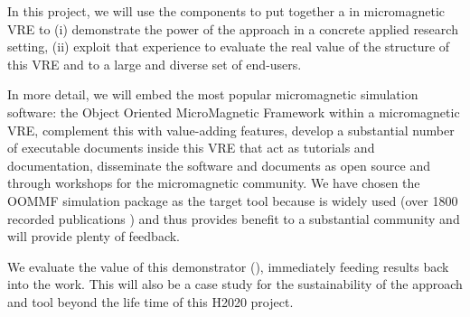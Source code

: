In this project, we will use the \TheProject components to put
together a in micromagnetic VRE to (i) demonstrate the power of the
approach in a concrete applied research setting, (ii) exploit that
experience to evaluate the real value of the structure of this VRE and
\TheProject to a large and diverse set of end-users.

In more detail, we will embed the most popular micromagnetic
simulation software: the Object Oriented MicroMagnetic Framework
\cite{OOMMF-url} within a micromagnetic VRE, complement this with
value-adding features, develop a substantial number of executable
documents inside this VRE that act as tutorials and documentation,
disseminate the software and documents as open source and through
workshops for the micromagnetic community.  We have chosen the OOMMF
simulation package as the target tool because is widely used (over
1800 recorded publications \cite{OOMMF-citations-url}) and thus
provides benefit to a substantial community and will provide plenty of
feedback.

We evaluate the value of this demonstrator
(), immediately feeding
results back into the \TheProject work. This will also
be a case study for the sustainability of the approach and tool beyond
the life time of this H2020 project.


